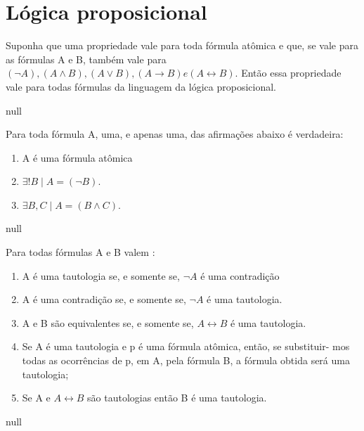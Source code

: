 \chapter{Lógica proposicional}

\begin{theorem} Suponha que uma propriedade vale para toda fórmula atômica e que, se vale para as fórmulas A e B, também vale para $( \neg A), (A \land B), (A \lor B), (A \rightarrow B) e (A \leftrightarrow B)$. Então essa propriedade vale para todas fórmulas da linguagem da lógica proposicional.
\end{theorem}

\begin{solucao}
  null
\end{solucao}

\begin{theorem} Para toda fórmula A, uma, e apenas uma, das afirmações abaixo é verdadeira:
  
  \begin{enumerate}[label=(\alph{*})]
		\item A é uma fórmula atômica
		\item $\exists ! B \mid  A = (\neg B) $.
		\item $\exists B, C \mid A = (B \land C)$.
	\end{enumerate}
  
\end{theorem}

\begin{solucao}
  null
\end{solucao}

\setcounter{th}{10}
\begin{theorem} Para todas fórmulas A e B valem :

  \begin{enumerate}[label=(\alph{*})]
		\item A é uma tautologia se, e somente se, $\neg A$ é uma contradição
		\item A é uma contradição se, e somente se, $\neg A$ é uma tautologia.
		\item A e B são equivalentes se, e somente se, $A \leftrightarrow B $ é uma tautologia.
		\item Se A é uma tautologia e p é uma fórmula atômica, então, se substituir-
    mos todas as ocorrências de p, em A, pela fórmula B, a fórmula obtida
    será uma tautologia;
		\item Se A e $A \leftrightarrow B$ são tautologias então B é uma tautologia.

	\end{enumerate}
  
\end{theorem}

\begin{solucao}
  null
\end{solucao}

